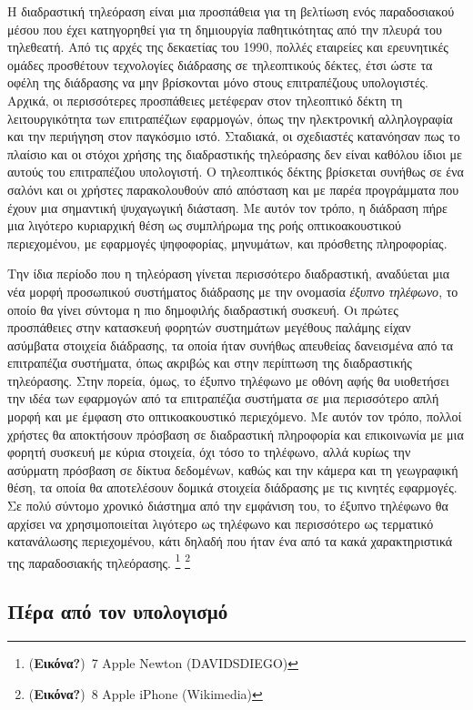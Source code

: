 \documentclass[
]{article}
\begin{document}
Η διαδραστική τηλεόραση είναι μια προσπάθεια για τη βελτίωση ενός
παραδοσιακού μέσου που έχει κατηγορηθεί για τη δημιουργία παθητικότητας
από την πλευρά του τηλεθεατή. Από τις αρχές της δεκαετίας του 1990,
πολλές εταιρείες και ερευνητικές ομάδες προσθέτουν τεχνολογίες διάδρασης
σε τηλεοπτικούς δέκτες, έτσι ώστε τα οφέλη της διάδρασης να μην
βρίσκονται μόνο στους επιτραπέζιους υπολογιστές. Αρχικά, οι περισσότερες
προσπάθειες μετέφεραν στον τηλεοπτικό δέκτη τη λειτουργικότητα των
επιτραπέζιων εφαρμογών, όπως την ηλεκτρονική αλληλογραφία και την
περιήγηση στον παγκόσμιο ιστό. Σταδιακά, οι σχεδιαστές κατανόησαν πως το
πλαίσιο και οι στόχοι χρήσης της διαδραστικής τηλεόρασης δεν είναι
καθόλου ίδιοι με αυτούς του επιτραπέζιου υπολογιστή. Ο τηλεοπτικός
δέκτης βρίσκεται συνήθως σε ένα σαλόνι και οι χρήστες παρακολουθούν από
απόσταση και με παρέα προγράμματα που έχουν μια σημαντική ψυχαγωγική
διάσταση. Με αυτόν τον τρόπο, η διάδραση πήρε μια λιγότερο κυριαρχική
θέση ως συμπλήρωμα της ροής οπτικοακουστικού περιεχομένου, με εφαρμογές
ψηφοφορίας, μηνυμάτων, και πρόσθετης πληροφορίας.

Την ίδια περίοδο που η τηλεόραση γίνεται περισσότερο διαδραστική,
αναδύεται μια νέα μορφή προσωπικού συστήματος διάδρασης με την ονομασία
\emph{έξυπνο τηλέφωνο}, το οποίο θα γίνει σύντομα η πιο δημοφιλής
διαδραστική συσκευή. Οι πρώτες προσπάθειες στην κατασκευή φορητών
συστημάτων μεγέθους παλάμης είχαν ασύμβατα στοιχεία διάδρασης, τα οποία
ήταν συνήθως απευθείας δανεισμένα από τα επιτραπέζια συστήματα, όπως
ακριβώς και στην περίπτωση της διαδραστικής τηλεόρασης. Στην πορεία,
όμως, το έξυπνο τηλέφωνο με οθόνη αφής θα υιοθετήσει την ιδέα των
εφαρμογών από τα επιτραπέζια συστήματα σε μια περισσότερο απλή μορφή και
με έμφαση στο οπτικοακουστικό περιεχόμενο. Με αυτόν τον τρόπο, πολλοί
χρήστες θα αποκτήσουν πρόσβαση σε διαδραστική πληροφορία και επικοινωνία
με μια φορητή συσκευή με κύρια στοιχεία, όχι τόσο το τηλέφωνο, αλλά
κυρίως την ασύρματη πρόσβαση σε δίκτυα δεδομένων, καθώς και την κάμερα
και τη γεωγραφική θέση, τα οποία θα αποτελέσουν δομικά στοιχεία
διάδρασης με τις κινητές εφαρμογές. Σε πολύ σύντομο χρονικό διάστημα από
την εμφάνιση του, το έξυπνο τηλέφωνο θα αρχίσει να χρησιμοποιείται
λιγότερο ως τηλέφωνο και περισσότερο ως τερματικό κατανάλωσης
περιεχομένου, κάτι δηλαδή που ήταν ένα από τα κακά χαρακτηριστικά της
παραδοσιακής τηλεόρασης. \footnote{(\textbf{Εικόνα?})~7 Αpple Newton
  (DAVIDSDIEGO)} \footnote{(\textbf{Εικόνα?})~8 Apple iPhone (Wikimedia)}

\hypertarget{ux3c0ux3adux3c1ux3b1-ux3b1ux3c0ux3cc-ux3c4ux3bfux3bd-ux3c5ux3c0ux3bfux3bbux3bfux3b3ux3b9ux3c3ux3bcux3cc}{%
\subsection{Πέρα από τον
υπολογισμό}\label{ux3c0ux3adux3c1ux3b1-ux3b1ux3c0ux3cc-ux3c4ux3bfux3bd-ux3c5ux3c0ux3bfux3bbux3bfux3b3ux3b9ux3c3ux3bcux3cc}}
\end{document}
